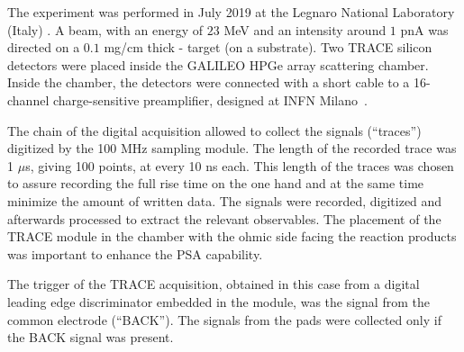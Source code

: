 The experiment was performed in July 2019 at the Legnaro National Laboratory
(Italy) \cite{kuba:compa}. A  beam, with an energy of $23$ MeV and an
intensity around $1$ pnA was directed on a $0.1$ mg/cm thick  -
 target (on a  substrate). Two TRACE silicon detectors
were placed inside the GALILEO HPGe array scattering chamber. Inside the
chamber, the detectors were connected with a short cable to a
16-channel charge-sensitive preamplifier, designed at INFN Milano~\cite{strano}.

\bigbreak

The chain of the digital acquisition allowed to collect the signals (“traces”)
digitized by the 100 MHz sampling module. The length of the recorded trace was
1 $\mu$s, giving 100 points, at every 10 ns each. This length of the traces
was chosen to assure recording the full rise time on the one hand and at the
same time minimize the amount of written data. The signals were recorded,
digitized and afterwards processed to extract the relevant observables. The
placement of the TRACE module in the chamber with the ohmic side facing the
reaction products was important to enhance the PSA capability.

\bigbreak

The trigger of the TRACE acquisition, obtained in this case from a digital
leading edge discriminator embedded in the module, was the signal from the
common electrode (“BACK”). The signals from the pads were collected only if
the BACK signal was present.

